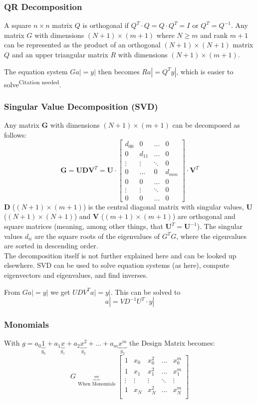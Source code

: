 \subsubsection{QR Decomposition}
A square $n \times n$ matrix $Q$ is orthogonal if $Q^T \cdot Q = Q \cdot Q^T = I$ or $Q^T = Q^{-1}$.
Any matrix $G$ with dimensions $(N+1) \times (m+1)$ where $N \geq m$ and rank $m+1$ can be represented as the product of an orthogonal $(N+1)\times(N+1)$ matrix $Q$ and an upper triangular matrix $R$ with dimensions $(N+1)\times(m+1)$.

The equation system $Ga| = y|$ then becomes $Ra|=Q^Ty|$, which is easier to solve\textsuperscript{Citation needed}.

\subsubsection{Singular Value Decomposition (SVD)}
Any matrix $\bm G$ with dimensions $(N+1) \times (m+1)$ can be decomposed as follows:
$$\bm G = \bm U \bm D \bm V^T = \bm U \cdot \begin{bmatrix}
  d_{00} & 0      & \ldots & 0\\
  0      & d_{11} & \ldots & 0\\
  \vdots & \vdots & \ddots & 0\\
  0      & \ldots & 0      & d_{mm}\\
  0      & 0      & \ldots & 0\\
  \vdots & \vdots & \ddots & 0\\
  0      & 0      & \ldots & 0
\end{bmatrix} \cdot \bm V^T$$
$\bm D$ ($(N+1) \times (m+1)$) is the central diagonal matrix with singular values,
$\bm U$ ($(N+1) \times (N+1)$) and $\bm V$ ($(m+1) \times (m+1)$) are orthogonal and square
matrices (meaning, among other things, that $\bm U^T = \bm U^{-1}$).
The singular values $d_{ii}$ are the square roots of the eigenvalues of $G^T G$,
where the eigenvalues are sorted in descending order.\\

The decomposition itself is not further explained here and can be looked up elsewhere.
SVD can be used to solve equation systems (as here), compute eigenvectors and eigenvalues,
and find inverses.

From $Ga| = y|$ we get $UDV^T a| = y|$. This can be solved to
\[
    a| = V D^{-1}U^T \cdot y|
\]

\subsubsection{Monomials} \label{sssec:ls_monomiale}
With
$g = a_0 \underbrace{1}_{g_0} + a_1 \underbrace{x}_{g_1} + a_2 \underbrace{x^2}_{g_2} +\ldots + a_m \underbrace{x^m}_{g_2}$
the Design Matrix becomes:
\[G \underbrace{=}_{\text{When Monomials}}
\begin{bmatrix}
  1 & x_0 & x_0^2  & \ldots & x_0^m\\
  1 & x_1 & x_1^2  & \ldots & x_1^m\\
  \vdots  & \vdots & \vdots  & \ddots & \vdots\\
  1 & x_N & x_N^2  & \ldots & x_N^m\\
\end{bmatrix}\]


